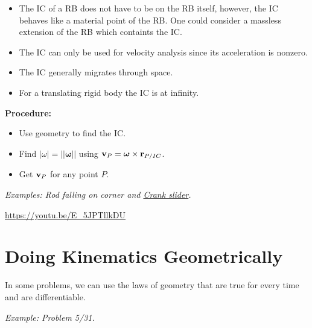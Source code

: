 \documentclass[
  letterpaper,
  DIV=11,
  numbers=noendperiod]{scrreprt}
\providecommand{\tightlist}{%
  \setlength{\itemsep}{0pt}\setlength{\parskip}{0pt}}
\newcommand{\lnorm}{\left|\!\left|}
\newcommand{\rnorm}{\right|\!\right|}
\newcommand{\bomega}{\boldsymbol{\omega}}
\begin{document}
\begin{tcolorbox}[enhanced jigsaw, arc=.35mm, bottomrule=.15mm, bottomtitle=1mm, breakable, colback=white, colbacktitle=quarto-callout-important-color!10!white, colframe=quarto-callout-important-color-frame, coltitle=black, left=2mm, leftrule=.75mm, opacityback=0, opacitybacktitle=0.6, rightrule=.15mm, title=\textcolor{quarto-callout-important-color}{\faExclamation}\hspace{0.5em}{Note!}, titlerule=0mm, toprule=.15mm, toptitle=1mm]

\begin{itemize}
\item
  The IC of a RB does not have to be on the RB itself, however, the IC
  behaves like a material point of the RB. One could consider a massless
  extension of the RB which containts the IC.
\item
  The IC can only be used for velocity analysis since its acceleration
  is nonzero.
\item
  The IC generally migrates through space.
\item
  For a translating rigid body the IC is at infinity.
\end{itemize}

\end{tcolorbox}

\textbf{Procedure:}

\begin{itemize}
\tightlist
\item
  Use geometry to find the IC.
\item
  Find \(|\omega| = \lnorm\bomega\rnorm\) using
  \({\bf v}_P=\bomega\times{\bf r}_{P/IC}\).
\item
  Get \({\bf v}_P\) for any point \(P\).
\end{itemize}

\emph{Examples: Rod falling on corner and
\href{https://www.youtube.com/watch?v=RDixpdSGERQ}{Crank slider}.}

\url{https://youtu.be/E_5JPTllkDU}

\section{Doing Kinematics
Geometrically}\label{doing-kinematics-geometrically}

In some problems, we can use the laws of geometry that are true for
every time and are differentiable.

\emph{Example: Problem 5/31.}
\end{document}
